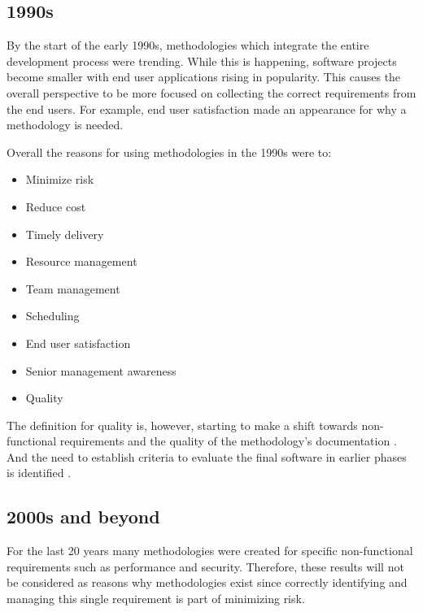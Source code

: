 \subsection{1990s}
By the start of the early 1990s, methodologies which integrate the entire development process were trending.
While this is happening, software projects become smaller with end user applications rising in popularity.
This causes the overall perspective to be more focused on collecting the correct requirements \cite{paul_1993} from the end users.
For example, end user satisfaction made an appearance for why a methodology is needed.
\cite{drake_1991}

Overall the reasons for using methodologies in the 1990s were to:
\begin{itemize}
    \item Minimize risk \cite{drake_1991, trussel_1999}
    \item Reduce cost \cite{drake_1991, scarre_1992, paul_1993}
    \item Timely delivery \cite{drake_1991, scarre_1992, herald_1993, trussel_1999}
    \item Resource management \cite{drake_1991}
    \item Team management \cite{drake_1991}
    \item Scheduling \cite{drake_1991, paul_1993}
    \item End user satisfaction \cite{drake_1991}
    \item Senior management awareness \cite{drake_1991}
    \item Quality \cite{drake_1991, scarre_1992, herald_1993, trussel_1999}
\end{itemize}

The definition for quality is, however, starting to make a shift towards non-functional requirements and the quality of the methodology's documentation \cite{scarre_1992}.
And the need to establish criteria to evaluate the final software in earlier phases is identified \cite{paul_1993, herald_1993, grossman_1997}.


\subsection{2000s and beyond}
For the last 20 years many methodologies were created for specific non-functional requirements such as performance and security.
Therefore, these results will not be considered as reasons why methodologies exist since correctly identifying and managing this single requirement is part of minimizing risk.

